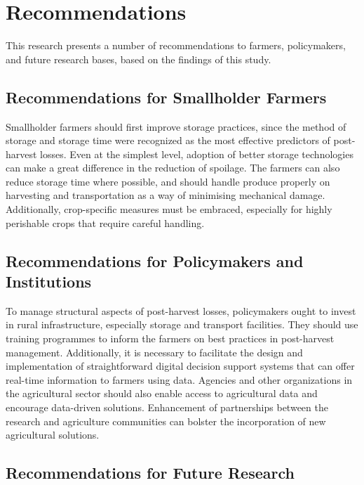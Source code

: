 \section{Recommendations}

This research presents a number of recommendations to farmers, policymakers, and future research
bases, based on the findings of this study.

\subsection{Recommendations for Smallholder Farmers}

Smallholder farmers should first improve storage practices, since the method of storage and storage
time were recognized as the most effective predictors of post-harvest losses. Even at the simplest
level, adoption of better storage technologies can make a great difference in the reduction of
spoilage. The farmers can also reduce storage time where possible, and should handle produce
properly on harvesting and transportation as a way of minimising mechanical damage. Additionally,
crop-specific measures must be embraced, especially for highly perishable crops that require
careful handling.

\subsection{Recommendations for Policymakers and Institutions}

To manage structural aspects of post-harvest losses, policymakers ought to invest in rural
infrastructure, especially storage and transport facilities. They should use training programmes to
inform the farmers on best practices in post-harvest management. Additionally, it is necessary to
facilitate the design and implementation of straightforward digital decision support systems that
can offer real-time information to farmers using data. Agencies and other organizations in the
agricultural sector should also enable access to agricultural data and encourage data-driven
solutions. Enhancement of partnerships between the research and agriculture communities can bolster
the incorporation of new agricultural solutions.

\subsection{Recommendations for Future Research}

